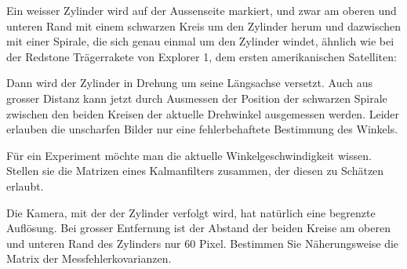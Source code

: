 Ein weisser Zylinder wird auf der Aussenseite markiert, und zwar
am oberen und unteren Rand mit einem schwarzen Kreis um den Zylinder
herum und dazwischen mit einer Spirale, die sich genau einmal
um den Zylinder windet, ähnlich wie bei der Redstone Trägerrakete von
Explorer 1, dem ersten amerikanischen Satelliten:
\begin{center}
\end{center}
Dann wird der Zylinder in Drehung um seine Längsachse versetzt.
Auch aus grosser Distanz kann jetzt durch Ausmessen der Position
der schwarzen Spirale zwischen den beiden Kreisen der aktuelle Drehwinkel
ausgemessen werden. Leider erlauben die unscharfen Bilder nur
eine fehlerbehaftete Bestimmung des Winkels.
\begin{teilaufgaben}
\item
Für ein Experiment
möchte man die aktuelle Winkelgeschwindigkeit wissen.
Stellen sie die Matrizen eines Kalmanfilters zusammen, der
diesen zu Schätzen erlaubt.
\item
Die Kamera, mit der der Zylinder verfolgt wird, hat natürlich eine
begrenzte Auflösung. Bei grosser Entfernung ist der Abstand der
beiden Kreise am oberen und unteren Rand des Zylinders nur 60 Pixel.
Bestimmen Sie Näherungsweise die Matrix der Messfehlerkovarianzen.
\end{teilaufgaben}


